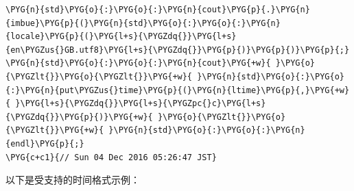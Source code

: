 
\begin{codeblockbg}
\begin{Verbatim}[commandchars=\\\{\},breaklines=true,breakanywhere=true,fontsize=\codefont,xleftmargin=17bp]
\PYG{n}{std}\PYG{o}{:}\PYG{o}{:}\PYG{n}{cout}\PYG{p}{.}\PYG{n}{imbue}\PYG{p}{(}\PYG{n}{std}\PYG{o}{:}\PYG{o}{:}\PYG{n}{locale}\PYG{p}{(}\PYG{l+s}{\PYGZdq{}}\PYG{l+s}{en\PYGZus{}GB.utf8}\PYG{l+s}{\PYGZdq{}}\PYG{p}{)}\PYG{p}{)}\PYG{p}{;}
\PYG{n}{std}\PYG{o}{:}\PYG{o}{:}\PYG{n}{cout}\PYG{+w}{ }\PYG{o}{\PYGZlt{}}\PYG{o}{\PYGZlt{}}\PYG{+w}{ }\PYG{n}{std}\PYG{o}{:}\PYG{o}{:}\PYG{n}{put\PYGZus{}time}\PYG{p}{(}\PYG{n}{ltime}\PYG{p}{,}\PYG{+w}{ }\PYG{l+s}{\PYGZdq{}}\PYG{l+s}{\PYGZpc{}c}\PYG{l+s}{\PYGZdq{}}\PYG{p}{)}\PYG{+w}{ }\PYG{o}{\PYGZlt{}}\PYG{o}{\PYGZlt{}}\PYG{+w}{ }\PYG{n}{std}\PYG{o}{:}\PYG{o}{:}\PYG{n}{endl}\PYG{p}{;}
\PYG{c+c1}{// Sun 04 Dec 2016 05:26:47 JST}
\end{Verbatim}
\end{codeblockbg}



以下是受支持的时间格式示例：



